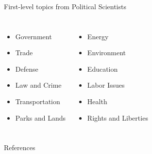 \documentclass[compress]{beamer}
\begin{document}


\begin{frame}{First-level topics from Political Scientists}

\begin{columns}
		\begin{itemize}
			\item Government
			\item Trade
			\item Defense
			\item Law and Crime
			\item Transportation
			\item Parks and Lands
		\end{itemize}
		\begin{itemize}
			\item Energy
			\item Environment
			\item Education
			\item Labor Issues
			\item Health
			\item Rights and Liberties
		\end{itemize}

\end{columns}

\end{frame}


\begin{frame}{References}

\tiny

\end{frame}
\end{document}
